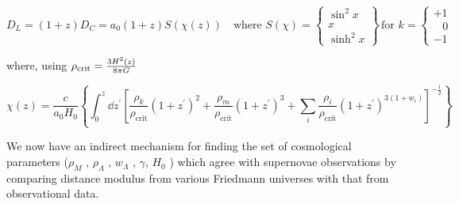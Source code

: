\begin{equation}
    D_{L}
    = (1+z) D_{C} 
    = a_{0} (1 + z) S \left( \chi{}(z) \right)
    \quad\text{where }
    S(\chi) = 
    \begin{Bmatrix}
    \sin^{2}\!x \\
    x \\
    \sinh^{2}\!x
    \end{Bmatrix}
    \,\text{for } k =
    \begin{cases}
    +1 \\
    \;\;\;0 \\
    -1
    \end{cases}
\label{eq:1.15}
\end{equation}

where, using $ \rho_{\mathrm{crit}} {} = \frac{3H^2(z)}{8\pi{}G}$

\begin{equation}
     \chi{} (z)
     = \frac{c}{a_{0} H_{0}}
     \left\{ \int_{0}^{z} \dd{z}^{\prime}
        \left[ 
            \frac{\rho_{k}}{\rho_{\mathrm{crit}}} \left( 1 + z^{\prime} \right)^{2}
            + \frac{\rho_{m}}{\rho_{\mathrm{crit}}} \left( 1 + z^{\prime} \right)^{3}
            + \sum_{i} \frac{\rho_{i}}{\rho_{\mathrm{crit}}} 
            \left( 1 + z^{\prime} \right)^{3(1+w_i)}
        \right]^{-\frac{1}{2}}
     \right\}
\label{eq:1.16}
\end{equation}

We now have an indirect mechanism for finding the set of cosmological parameters ($\rho_M$ , $\rho_{\Lambda}$ , $w_{\Lambda}$ , $\gamma$, $H_0$ ) which agree with supernovae observations by comparing distance modulus from various Friedmann universes with that from observational data.
